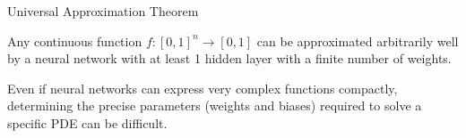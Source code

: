 
\begin{frame}{Universal Approximation Theorem}
    
    Any continuous function  $f : [0, 1]^{n} \rightarrow [0, 1]$  can be approximated arbitrarily well by a neural network with at least 1 hidden layer with a finite number of weights.

    Even if neural networks can express very complex functions compactly, determining the precise parameters (weights and biases) required to solve a specific PDE can be difficult.
    
\end{frame}